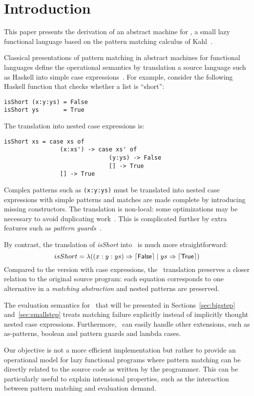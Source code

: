 \section{Introduction}

This paper presents the derivation of an abstract machine for \lambdaPMC, a small
lazy functional language based on the pattern matching calculus
of Kahl~\cite{kahl_2004}.

Classical presentations of pattern matching in abstract machines for
functional languages define the operational semantics by translation
a source language such as Haskell
into simple case expressions~\cite{spj_1987_chap5,jones_1992}. For
example, consider the following Haskell function that checks whether a
list is ``short'':
\begin{verbatim}
isShort (x:y:ys) = False
isShort ys       = True
\end{verbatim}
The translation into nested case expressions is:
\begin{verbatim}
isShort xs = case xs of
                (x:xs') -> case xs' of
                              (y:ys) -> False
                              [] -> True
                [] -> True
\end{verbatim}
Complex patterns such as \verb|(x:y:ys)| must be translated into 
nested case expressions with simple patterns and
matches are made complete by introducing missing constructors.
The translation is non-local: some optimizations may be 
necessary to avoid duplicating work~\cite{spj_1987_chap5}.
This is complicated further by extra features
such as \emph{pattern guards}~\cite{haskell_2010_report}.

By contrast, the translation of \textit{isShort} into \lambdaPMC\ is much more
straightforward:
\[
  isShort = \lambda ((x:y:ys) \Rightarrow \left\lceil \textsf{False}\right\rceil \mid
                     ys \Rightarrow \left\lceil \textsf{True}\right\rceil)
\]
Compared to the version with case expressions, the \lambdaPMC\ translation
preserves a closer relation to the original source program: each
equation corresponds to one alternative in a \emph{matching
  abstraction} and nested patterns are preserved. 

The evaluation semantics for \lambdaPMC\ that will be presented in
Sections~\ref{sec:bigstep} and~\ref{sec:smallstep} treats matching
failure explicitly instead of implicitly thought nested case
expressions. Furthermore, \lambdaPMC\ can easily handle
other extensions, such as as-patterns, boolean and
pattern guards and lambda cases.

Our objective is not a more efficient implementation but rather
to provide an operational model for lazy functional
programs where pattern matching can be directly related to the source
code as written by the programmer. This can be particularly useful to
explain intensional properties, such as the interaction between
pattern matching and evaluation demand.



